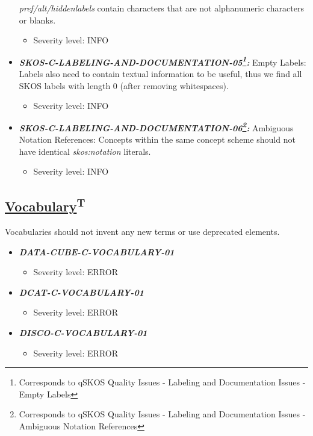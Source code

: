 \documentclass{llncs}
\begin{document}
\begin{itemize}
	\emph{pref/alt/hiddenlabels} contain characters that are not alphanumeric characters or blanks.
	\begin{itemize}
		\item Severity level: INFO
	\end{itemize}
	\item \textbf{{\em SKOS-C-LABELING-AND-DOCUMENTATION-05\footnote{Corresponds to qSKOS Quality Issues - Labeling and Documentation Issues - Empty Labels}:}}
	Empty Labels:
	Labels also need to contain textual information to be useful, thus we find all SKOS labels with length 0 (after removing whitespaces). 
	\begin{itemize}
		\item Severity level: INFO
	\end{itemize}
	\item \textbf{{\em SKOS-C-LABELING-AND-DOCUMENTATION-06\footnote{Corresponds to qSKOS Quality Issues - Labeling and Documentation Issues - Ambiguous Notation References}:}}
	Ambiguous Notation References:
	Concepts within the same concept scheme should not have identical \emph{skos:notation} literals. 
	\begin{itemize}
		\item Severity level: INFO
	\end{itemize}
\end{itemize}

\subsection{\underline{Vocabulary}\textsuperscript{T}}
Vocabularies should not invent any new terms or use deprecated elements. 

\begin{itemize}
	\item \textbf{\em DATA-CUBE-C-VOCABULARY-01} 
	\begin{itemize}
		\item Severity level: ERROR
	\end{itemize}
\end{itemize}

\begin{itemize}
	\item \textbf{\em DCAT-C-VOCABULARY-01} 
	\begin{itemize}
		\item Severity level: ERROR
	\end{itemize}
\end{itemize}

\begin{itemize}
	\item \textbf{\em DISCO-C-VOCABULARY-01} 
	\begin{itemize}
		\item Severity level: ERROR
	\end{itemize}
\end{itemize}
\end{document}
